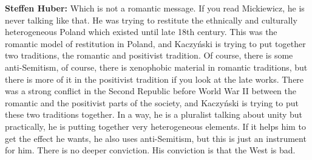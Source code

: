 \textbf{Steffen Huber:} Which is not a romantic message. If you read Mickiewicz, he is never talking like that. He was trying to restitute the ethnically and culturally heterogeneous Poland which existed until late 18th century. This was the romantic model of restitution in Poland, and Kaczyński is trying to put together two traditions, the romantic and positivist tradition. Of course, there is some anti-Semitism, of course, there is xenophobic material in romantic traditions, but there is more of it in the positivist tradition if you look at the late works. There was a strong conflict in the Second Republic before World War II between the romantic and the positivist parts of the society, and Kaczyński is trying to put these two traditions together. In a way, he is a pluralist talking about unity but practically, he is putting together very heterogeneous elements. If it helps him to get the effect he wants, he also uses anti-Semitism, but this is just an instrument for him. There is no deeper conviction. His conviction is that the West is bad. 